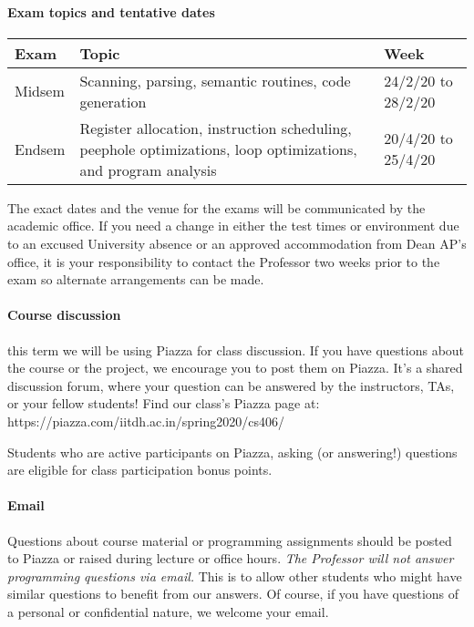 \documentclass{article}
\begin{document}
\paragraph{Exam topics and tentative dates}
\begin{table}[H]
\centering
\begin{tabulary}{\linewidth}{|l|p{70mm}|p{40mm}|}\hline
Exam & Topic & Week \\ \hline
Midsem & Scanning, parsing, semantic routines, code generation &  24/2/20 to 28/2/20 \\ \hline
Endsem & Register allocation, instruction scheduling, peephole optimizations, loop optimizations, and program analysis & 20/4/20 to 25/4/20 \\
\hline
\end{tabulary}
\end{table}
The exact dates and the venue for the exams will be communicated by the academic office.
If you need a change in either the test times or environment due to an excused University absence or an approved accommodation from Dean AP's office, it is your responsibility to contact the Professor two weeks prior to the exam so alternate arrangements can be made. 

\paragraph{Course discussion} this term we will be using Piazza for class discussion. If you have questions about the course or the project, we encourage you to post them on Piazza. It's a shared discussion forum, where your question can be answered by the instructors, TAs, or your fellow students! Find our class's Piazza page at: https://piazza.com/iitdh.ac.in/spring2020/cs406/

Students who are active participants on Piazza, asking (or answering!) questions are eligible for class participation bonus points.

\paragraph{Email} Questions about course material or programming assignments should be posted to Piazza or raised during lecture or office hours. {\em The Professor will not answer programming questions via email.} This is to allow other students who might have similar questions to benefit from our answers. Of course, if you have questions of a personal or confidential nature, we welcome your email.
\end{document}
